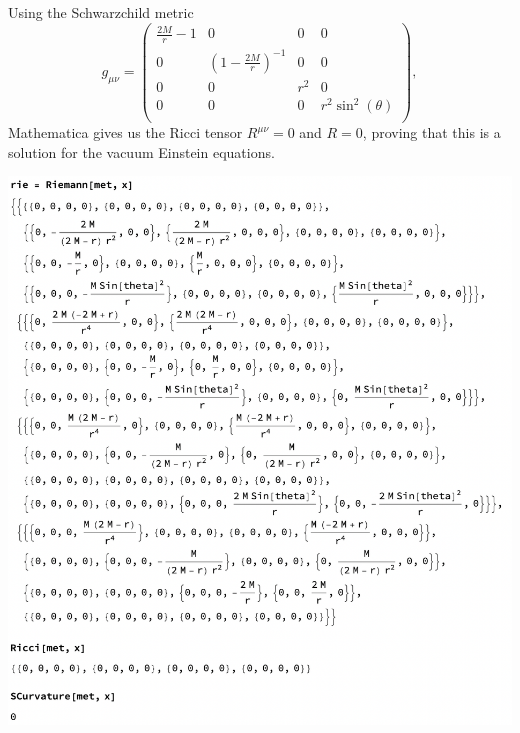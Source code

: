 \documentclass{../../templates/lkx_pset}
\begin{document}
\begin{solution}
	Using the Schwarzchild metric
	\[
		g_{\mu\nu} =
		\left(
		\begin{array}{cccc}
				\frac{2 M}{r}-1 & 0                                 & 0   & 0                   \\
				0               & \left(1-\frac{2 M}{r}\right)^{-1} & 0   & 0                   \\
				0               & 0                                 & r^2 & 0                   \\
				0               & 0                                 & 0   & r^2 \sin ^2(\theta) \\
			\end{array}
		\right),
	\]
	Mathematica gives us the Ricci tensor $R^{\mu\nu}=0$ and $R=0$, proving that this is a solution for the vacuum Einstein equations.
	\begin{center}
		\includegraphics[scale=0.5]{problem7.png}
	\end{center}
\end{solution}
\end{document}
